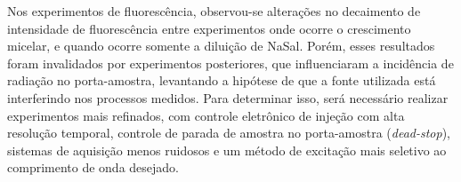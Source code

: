 	Nos experimentos de fluorescência, observou-se alterações no decaimento de intensidade de fluorescência entre experimentos onde ocorre o crescimento micelar, e quando ocorre somente a diluição de NaSal. Porém, esses resultados foram invalidados por experimentos posteriores, que influenciaram a incidência de radiação no porta-amostra, levantando a hipótese de que a fonte utilizada está interferindo nos processos medidos. Para determinar isso, será necessário realizar experimentos mais refinados, com controle eletrônico de injeção com alta resolução temporal, controle de parada de amostra no porta-amostra (\emph{dead-stop}), sistemas de aquisição menos ruidosos e um método de excitação mais seletivo ao comprimento de onda desejado.
	
\FloatBarrier